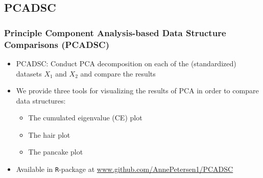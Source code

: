 \documentclass[a4]{beamer}
\newcommand{\blue}[1]{\textcolor{blue}{#1}}
\begin{document}
\subsection{PCADSC}
\begin{frame}
\frametitle{Principle Component Analysis-based Data Structure Comparisons (PCADSC)}
\begin{itemize}
\item PCADSC: Conduct PCA decomposition on each of the (standardized) datasets $X_1$ and $X_2$ and compare the results
\item We provide three tools for visualizing the results of PCA in order to compare data structures:
	\begin{itemize}
		\item The cumulated eigenvalue (CE) plot \onslide<2->{\blue{- compare eigenvalues}}
		\item The hair plot \onslide<3->{\blue{- explain $S_1$ from $S_2$ (and $S_2$ from $S_1$)}}
		\item The pancake plot \onslide<4->{\blue{- compare loadings}}
	\end{itemize}
\item Available in \texttt{R}-package at \url{www.github.com/AnnePetersen1/PCADSC}
\end{itemize}
\end{frame}
\end{document}
